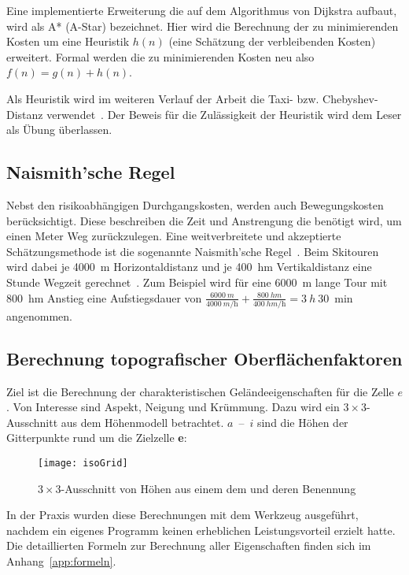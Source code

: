 Eine implementierte Erweiterung die auf dem Algorithmus von Dijkstra aufbaut, wird als A* (A-Star) bezeichnet. Hier wird die Berechnung der zu minimierenden Kosten um eine Heuristik $h(n)$ (eine Schätzung der verbleibenden Kosten) erweitert. Formal werden die zu minimierenden Kosten neu also $f(n)=g(n)+h(n)$.~\cite{Hart1968}

Als Heuristik wird im weiteren Verlauf der Arbeit die Taxi- bzw. Chebyshev-Distanz verwendet~\cite{cantrell2000modern}. Der Beweis für die Zulässigkeit der Heuristik wird dem Leser als Übung überlassen. 

\subsection{Naismith'sche Regel}

Nebst den risikoabhängigen Durchgangskosten, werden auch Bewegungskosten berücksichtigt. Diese beschreiben die Zeit und Anstrengung die benötigt wird, um einen Meter Weg zurückzulegen. Eine weitverbreitete und akzeptierte Schätzungsmethode ist die sogenannte Naismith'sche Regel~\cite{naismithsrule}.
Beim Skitouren wird dabei je \qty{4000}{m} Horizontaldistanz und je \qty{400}{hm} Vertikaldistanz eine Stunde Wegzeit gerechnet~\cite{sacbergspwinter}\cite{naismithsrule}. 
Zum Beispiel wird für eine \qty{6000}{m} lange Tour mit \qty{800}{hm} Anstieg eine Aufstiegsdauer von $\frac{\qty{6000}{m}}{\qty{4000}{m\per\hour}} + \frac{\qty{800}{hm}}{\qty{400}{hm\per\hour}} = \qty{3}{h}\ \qty{30}{\min}$ angenommen.

\subsection{Berechnung topografischer Oberflächenfaktoren}
Ziel ist die Berechnung der charakteristischen Geländeeigenschaften für die Zelle $e$.
Von Interesse sind Aspekt, Neigung und Krümmung.
Dazu wird ein $3 \times 3$-Ausschnitt aus dem Höhenmodell betrachtet. 
$a$~--~$i$ sind die Höhen der Gitterpunkte rund um die Zielzelle \textbf{e}:

\begin{figure}[H]
  \centering
  \texttt{[image: isoGrid]}
  \caption{$3 \times 3$-Ausschnitt von Höhen aus einem \acrshort{dem} und deren Benennung}
\end{figure}

In der Praxis wurden diese Berechnungen mit dem Werkzeug  ausgeführt, nachdem ein eigenes Programm keinen erheblichen Leistungsvorteil erzielt hatte. Die detaillierten Formeln zur Berechnung aller Eigenschaften finden sich im Anhang~\ref{app:formeln}.


